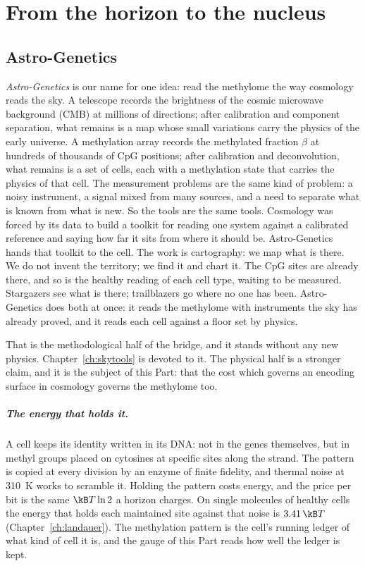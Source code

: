 \chapter{From the horizon to the nucleus}\label{ch:bridge}

\section{Astro-Genetics}

\emph{Astro-Genetics} is our name for one idea: read the methylome the way
cosmology reads the sky. A telescope records the brightness of the cosmic microwave background
(CMB) at millions of directions; after calibration and component separation, what remains is a map
whose small variations carry the physics of the early universe. A methylation array records the
methylated fraction $\beta$ at hundreds of thousands of CpG positions; after calibration and
deconvolution, what remains is a set of cells, each with a methylation state that carries the
physics of that cell. The measurement problems are the same kind of problem: a noisy instrument, a
signal mixed from many sources, and a need to separate what is known from what is new. So the
tools are the same tools.
Cosmology was forced by its data to build a toolkit for reading one system against a calibrated reference and saying how far it sits from
where it should be. Astro-Genetics hands that toolkit to the cell. The work is cartography: we map what is there. We do not invent the
territory; we find it and chart it. The CpG sites are already there, and so is the healthy reading of each cell type, waiting to be
measured. Stargazers see what is there; trailblazers go where no one has been. Astro-Genetics does both at once: it reads the methylome
with instruments the sky has already proved, and it reads each cell against a floor set by physics. \analogy

That is the methodological half of the bridge, and it stands without any new physics. Chapter~\ref{ch:skytools} is
devoted to it. The physical half is a stronger claim, and it is the subject of this Part: that the
cost which governs an encoding surface in cosmology governs the methylome too.
\paragraph{The energy that holds it.} A cell keeps its identity written in its DNA: not in the genes themselves, but in methyl groups placed
on cytosines at specific sites along the strand. The pattern is copied at every division by an enzyme of finite fidelity, and thermal noise
at 310~K works to scramble it. Holding the pattern costs energy, and the price per bit is the same $\kB T\ln2$ a horizon charges. On single
molecules of healthy cells the energy that holds each maintained site against that noise is $3.41\,\kB T$ (Chapter~\ref{ch:landauer}).
\measured{} The methylation pattern is the cell's running ledger of what kind of cell it is, and the gauge of this Part reads how well
the ledger is kept.

